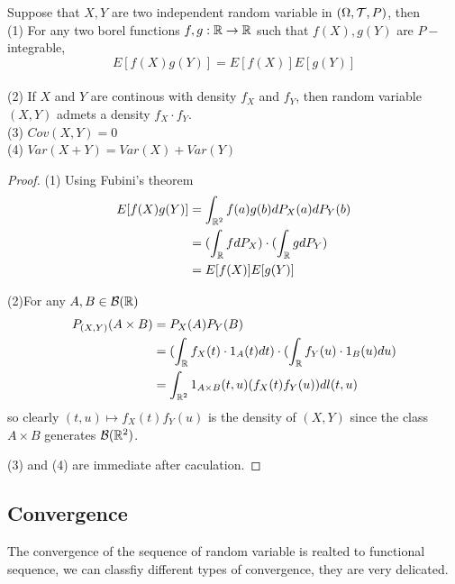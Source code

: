 \documentclass[en,geye,blue,normal,12pt,bibend=bibtex]{elegantnote}
\begin{document}
\begin{corollary}
    Suppose that \(X,Y\) are two independent random variable in \((\Omega, \mathcal{T}, P)\), then
    \\(1) For any two borel functions \(f,g: \mathbb{R} \to \mathbb{R}\) such that \(f(X),g(Y)\) are \(P-\)integrable,\[E[f(X)g(Y)] = E[f(X)]E[g(Y)]\]
    \\(2) If \(X\) and \(Y\) are continous with density \(f_X \) and \(f_Y\), then random variable \((X,Y)\) admets a density \(f_X\cdot f_Y\).
    \\(3) \(Cov(X,Y) = 0\)
    \\(4) \(Var(X+Y) = Var(X)+Var(Y)\)

    \begin{proof}
        (1) Using Fubini's theorem \begin{align*}
            E[f(X)g(Y)] &= \int_{\mathbb{R}^2} f(a)g(b) dP_X(a)dP_Y(b) \\
            &= (\int_{\mathbb{R}} fdP_X) \cdot (\int_{\mathbb{R}} gdP_Y) \\
            &= E[f(X)]E[g(Y)]
        \end{align*}

        (2)For any \(A,B \in \mathcal{B}(\mathbb{R})\)  \begin{align*}
            P_{(X,Y)}(A \times B) &= P_X(A)P_Y(B) \\
            &= (\int_{\mathbb{R}} f_X(t) \cdot 1_A(t) dt) \cdot (\int_{\mathbb{R}} f_Y(u) \cdot 1_B(u) du) \\
            &= \int_{\mathbb{R}^2} 1_{A \times B}(t,u)(f_X(t)f_Y(u))dl(t,u) 
        \end{align*}
        so clearly \((t,u) \mapsto f_X(t)f_Y(u)\) is the density of \((X,Y)\) since the class \({A \times B}\) generates \(\mathcal{B}(\mathbb{R}^2)\).

        (3) and (4) are immediate after caculation.
    \end{proof}
\end{corollary}

\subsection{Convergence}
The convergence of the sequence of random variable is realted to functional sequence, we can classfiy different types of convergence, they are very delicated.
\end{document}
